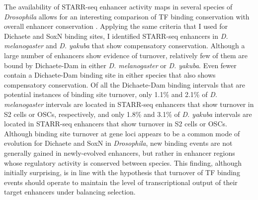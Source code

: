 The availability of STARR-seq enhancer activity maps in several species of \emph{Drosophila} allows for an interesting comparison of TF binding conservation with overall enhancer conservation \citep{arnold_genome-wide_2013}. Applying the same criteria that I used for Dichaete and SoxN binding sites, I identified STARR-seq enhancers in \emph{D. melanogaster} and \emph{D. yakuba} that show compensatory conservation. Although a large number of enhancers show evidence of turnover, relatively few of them are bound by Dichaete-Dam in either \emph{D. melanogaster} or \emph{D. yakuba}. Even fewer contain a Dichaete-Dam binding site in either species that also shows compensatory conservation. Of all the Dichaete-Dam binding intervals that are potential instances of binding site turnover, only 1.1\% and 2.1\% of \emph{D. melanogaster} intervals are located in STARR-seq enhancers that show turnover in S2 cells or OSCs, respectively, and only 1.8\% and 3.1\% of \emph{D. yakuba} intervals are located in STARR-seq enhancers that show turnover in S2 cells or OSCs. Although binding site turnover at gene loci appears to be a common mode of evolution for Dichaete and SoxN in \emph{Drosophila}, new binding events are not generally gained in newly-evolved enhancers, but rather in enhancer regions whose regulatory activity is conserved between species. This finding, although initially surprising, is in line with the hypothesis that turnover of TF binding events should operate to maintain the level of transcriptional output of their target enhancers under balancing selection.\\


